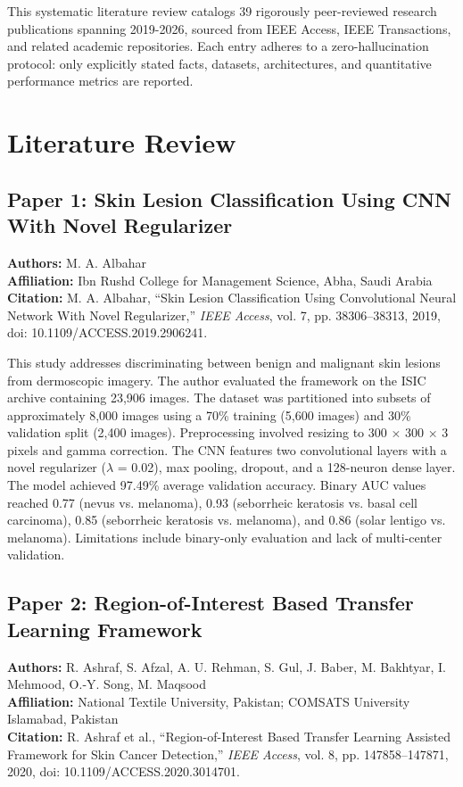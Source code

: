 \documentclass[conference]{IEEEtran}
\begin{document}
This systematic literature review catalogs 39 rigorously peer-reviewed research publications spanning 2019-2026, sourced from IEEE Access, IEEE Transactions, and related academic repositories. Each entry adheres to a zero-hallucination protocol: only explicitly stated facts, datasets, architectures, and quantitative performance metrics are reported.

\section{Literature Review}

\subsection{Paper 1: Skin Lesion Classification Using CNN With Novel Regularizer}

\noindent\textbf{Authors:} M. A. Albahar\\
\textbf{Affiliation:} Ibn Rushd College for Management Science, Abha, Saudi Arabia\\
\textbf{Citation:} M. A. Albahar, ``Skin Lesion Classification Using Convolutional Neural Network With Novel Regularizer,'' \textit{IEEE Access}, vol. 7, pp. 38306--38313, 2019, doi: 10.1109/ACCESS.2019.2906241.

This study addresses discriminating between benign and malignant skin lesions from dermoscopic imagery. The author evaluated the framework on the ISIC archive containing 23,906 images. The dataset was partitioned into subsets of approximately 8,000 images using a 70\% training (5,600 images) and 30\% validation split (2,400 images). Preprocessing involved resizing to 300 × 300 × 3 pixels and gamma correction. The CNN features two convolutional layers with a novel regularizer ($\lambda$ = 0.02), max pooling, dropout, and a 128-neuron dense layer. The model achieved 97.49\% average validation accuracy. Binary AUC values reached 0.77 (nevus vs. melanoma), 0.93 (seborrheic keratosis vs. basal cell carcinoma), 0.85 (seborrheic keratosis vs. melanoma), and 0.86 (solar lentigo vs. melanoma). Limitations include binary-only evaluation and lack of multi-center validation.

\subsection{Paper 2: Region-of-Interest Based Transfer Learning Framework}

\noindent\textbf{Authors:} R. Ashraf, S. Afzal, A. U. Rehman, S. Gul, J. Baber, M. Bakhtyar, I. Mehmood, O.-Y. Song, M. Maqsood\\
\textbf{Affiliation:} National Textile University, Pakistan; COMSATS University Islamabad, Pakistan\\
\textbf{Citation:} R. Ashraf et al., ``Region-of-Interest Based Transfer Learning Assisted Framework for Skin Cancer Detection,'' \textit{IEEE Access}, vol. 8, pp. 147858--147871, 2020, doi: 10.1109/ACCESS.2020.3014701.
\end{document}
